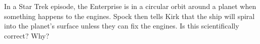  In a Star Trek episode, the Enterprise is in a circular
orbit around a planet when something happens to the engines.
Spock then tells Kirk that the ship will spiral into the
planet's surface unless they can fix the engines. Is this
scientifically correct? Why?
